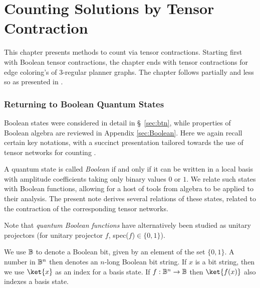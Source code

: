 \part{Counting Solutions by Tensor Contraction}\label{part:count}

This chapter presents methods to count via tensor contractions. Starting first with Boolean tensor contractions, the chapter ends with tensor contractions for edge coloring's of 3-regular planner graphs.  The chapter follows partially \cite{2015JSP...160.1389B} and less so \cite{Penrose} as presented in \cite{biamonte2017tensor}. 

\section{Returning to Boolean Quantum States}

Boolean states were considered in detail in \S~\ref{sec:btn}, while properties of Boolean algebra are reviewed in Appendix \ref{sec:Boolean}.  Here we again recall certain key notations, 
with a succinct presentation tailored towards the use of tensor networks for counting \cite{2015JSP...160.1389B, VTN, Morton_2012, 2012PhRvL.109c0503C,Kourtis2019}.  

\begin{remark}
A quantum state is called {\it Boolean} if and only if it can be written in a local basis with amplitude coefficients taking only binary values $0$ or $1$. We relate such states with Boolean functions, allowing for a host of tools from algebra to be applied to their analysis. The present note derives several relations of these states, related to the contraction of the corresponding tensor networks.   
\end{remark}

\begin{remark}
 Note that {\it quantum Boolean functions} have alternatively been studied \cite{cj10-01} as unitary projectors (for unitary projector $f$,  spec($f$)$\in\{0,1\}$). 
\end{remark}

\begin{remark}[Notation]
We use ${\mathbb B}$ to denote a Boolean bit, given by an element of the set $\{0,1\}$.  
A number in ${\mathbb B}^n$ then denotes an $n$-long Boolean bit string.  If $x$ is a bit string, 
then we use $\ket{x}$ as an index for a basis state.  
If $f:{\mathbb B}^n\rightarrow {\mathbb B}$ then $\ket{f(x)}$ also indexes a basis state.  
\end{remark}


